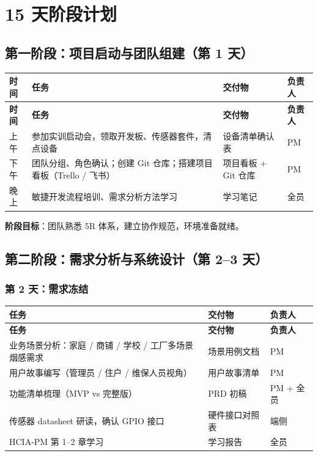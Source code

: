 \documentclass[UTF8,12pt,a4paper]{ctexart}
\begin{document}
\section{15 天阶段计划}

\subsection{第一阶段：项目启动与团队组建（第 1 天）}

\begin{longtable}{C{2cm}L{6.5cm}L{4.5cm}C{2cm}}
\toprule
\textbf{时间} & \textbf{任务} & \textbf{交付物} & \textbf{负责人} \\
\midrule
\endfirsthead
\toprule
\textbf{时间} & \textbf{任务} & \textbf{交付物} & \textbf{负责人} \\
\midrule
\endhead
\bottomrule
\endfoot

上午 & 参加实训启动会，领取开发板、传感器套件，清点设备 & 设备清单确认表 & PM \\
\midrule
下午 & 团队分组、角色确认；创建 Git 仓库；搭建项目看板（Trello / 飞书） & 项目看板 + Git 仓库 & PM \\
\midrule
晚上 & 敏捷开发流程培训、需求分析方法学习 & 学习笔记 & 全员 \\
\bottomrule
\end{longtable}

\textbf{阶段目标}：团队熟悉 5R 体系，建立协作规范，环境准备就绪。

\subsection{第二阶段：需求分析与系统设计（第 2--3 天）}

\subsubsection{第 2 天：需求冻结}

\begin{longtable}{L{6cm}L{4.5cm}C{2.5cm}}
\toprule
\textbf{任务} & \textbf{交付物} & \textbf{负责人} \\
\midrule
\endfirsthead
\toprule
\textbf{任务} & \textbf{交付物} & \textbf{负责人} \\
\midrule
\endhead
\bottomrule
\endfoot

业务场景分析：家庭 / 商铺 / 学校 / 工厂多场景烟感需求 & 场景用例文档 & PM \\
\midrule
用户故事编写（管理员 / 住户 / 维保人员视角） & 用户故事清单 & PM \\
\midrule
功能清单梳理（MVP vs 完整版） & PRD 初稿 & PM + 全员 \\
\midrule
传感器 datasheet 研读，确认 GPIO 接口 & 硬件接口对照表 & 端侧 \\
\midrule
HCIA-PM 第 1--2 章学习 & 学习报告 & 全员 \\
\bottomrule
\end{longtable}
\end{document}

